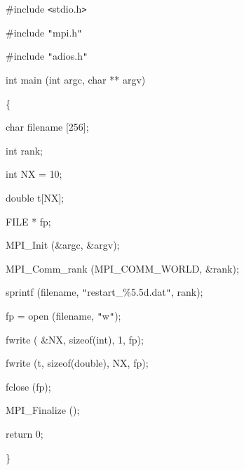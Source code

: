 \vspace{22pt}
\#include \texttt{<}stdio.h\texttt{>}

\vspace{10pt}
\#include \texttt{"}mpi.h\texttt{"}

\vspace{10pt}
\#include \texttt{"}adios.h\texttt{"}

\vspace{10pt}
int main (int argc, char ** argv) 

\vspace{10pt}
\{

\vspace{10pt}
\leftskip=18pt
char      \textbf{    } filename [256];

\vspace{10pt}
int              rank;

\vspace{10pt}
int              NX\textbf{ }=\textbf{ }10;

\vspace{10pt}
double      t[NX];

\vspace{10pt}
FILE          * fp;

\vspace{22pt}
MPI\_Init (\&argc, \&argv);

\vspace{10pt}
MPI\_Comm\_rank (MPI\_COMM\_WORLD, \&rank);

\vspace{10pt}
sprintf (filename, \texttt{"}restart\_\%5.5d.dat\texttt{"}, rank);

\vspace{10pt}
fp = open (filename, \texttt{"}w\texttt{"});

\vspace{10pt}
fwrite ( \&NX, sizeof(int), 1, fp);

\vspace{10pt}
fwrite (t,  sizeof(double), NX, fp);

\vspace{10pt}
fclose (fp);

\vspace{22pt}
MPI\_Finalize ();

\vspace{10pt}
return 0;

\vspace{10pt}
\leftskip=0pt
\}

\label{HRef119579280}\label{HToc144350182}

